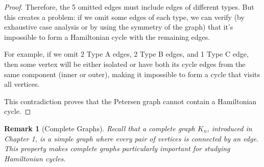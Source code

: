 \documentclass{article}
\newtheorem{remark}{Remark}
\theoremstyle{definition}
\begin{document}
\begin{proof}
Therefore, the 5 omitted edges must include edges of different types. But this creates a problem: if we omit some edges of each type, we can verify (by exhaustive case analysis or by using the symmetry of the graph) that it's impossible to form a Hamiltonian cycle with the remaining edges.

For example, if we omit 2 Type A edges, 2 Type B edges, and 1 Type C edge, then some vertex will be either isolated or have both its cycle edges from the same component (inner or outer), making it impossible to form a cycle that visits all vertices.

This contradiction proves that the Petersen graph cannot contain a Hamiltonian cycle.
\end{proof}

\begin{remark}[Complete Graphs]
Recall that a complete graph $K_n$, introduced in Chapter 1, is a simple graph where every pair of vertices is connected by an edge. This property makes complete graphs particularly important for studying Hamiltonian cycles.
\end{remark}
\end{document}

